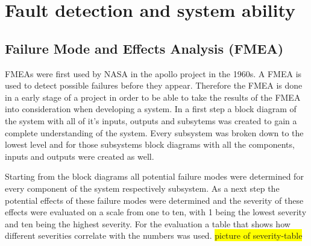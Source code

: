 \documentclass[ExampleMasters.tex]{subfiles}
\begin{document}
\clearpage


\chapter{Fault detection and system ability}
\label{chap:fault_detection}
\section{Failure Mode and Effects Analysis (FMEA)}
\label{sec:FMEA}
FMEAs were first used by NASA in the apollo project in the 1960s.
A FMEA is used to detect possible failures before they appear. Therefore the FMEA is done in a early stage of a project in order to be able to take the results of the FMEA into consideration when developing a system.
In a first step a block diagram of the system with all of it's inputs, outputs and subsytems was created to gain a complete understanding of the system. Every subsystem was broken down to the lowest level and for those subsystems block diagrams with all the components, inputs and outputs were created as well.

Starting from the block diagrams all potential failure modes were determined for every component of the system respectively subsystem. As a next step the potential effects of these failure modes were determined and the severity of these effects were evaluated on a scale from one to ten,  with 1 being the lowest severity and ten being the highest severity. For the evaluation a table that shows how different severities correlate with the numbers was used. \colorbox{yellow}{picture of severity-table}    
\end{document}
